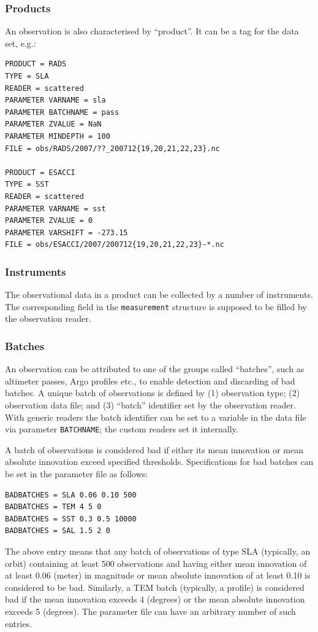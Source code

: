 \documentclass[11pt]{report}
\begin{document}
\subsubsection{Products}

An observation is also characterised by ``product''.
It can be a tag for the data set, e.g.:
\begin{Verbatim}[frame=single,fontsize=\footnotesize]
PRODUCT = RADS
TYPE = SLA
READER = scattered
PARAMETER VARNAME = sla
PARAMETER BATCHNAME = pass
PARAMETER ZVALUE = NaN
PARAMETER MINDEPTH = 100
FILE = obs/RADS/2007/??_200712{19,20,21,22,23}.nc

PRODUCT = ESACCI
TYPE = SST
READER = scattered
PARAMETER VARNAME = sst
PARAMETER ZVALUE = 0
PARAMETER VARSHIFT = -273.15
FILE = obs/ESACCI/2007/200712{19,20,21,22,23}-*.nc
\end{Verbatim}

\subsubsection{Instruments}

The observational data in a product can be collected by a number of instruments.
The corresponding field in the \verb|measurement| structure is supposed to be filled by the observation reader.

\subsubsection{Batches}
\label{sec:batches}

An observation can be attributed to one of the groups called ``batches'', such as altimeter passes, Argo profiles etc., to enable detection and discarding of bad batches.
A unique batch of observations is defined by (1) observation type; (2) observation data file; and (3) ``batch'' identifier set by the observation reader.
With generic readers the batch identifier can be set to a variable in the data file via parameter \verb|BATCHNAME|; the custom readers set it internally.

A batch of observations is considered bad if either its mean innovation or mean absolute innovation exceed specified thresholds.
Specifications for bad batches can be set in the parameter file as follows:
\begin{Verbatim}[frame=single,fontsize=\footnotesize]
BADBATCHES = SLA 0.06 0.10 500
BADBATCHES = TEM 4 5 0
BADBATCHES = SST 0.3 0.5 10000
BADBATCHES = SAL 1.5 2 0
\end{Verbatim}
The above entry means that any batch of observations of type SLA (typically, an orbit) containing at least 500 observations and having either mean innovation of at least 0.06 (meter) in magnitude or mean absolute innovation of at least 0.10 is considered to be bad.
Similarly, a TEM batch (typically, a profile) is considered bad if the mean innovation exceeds 4 (degrees) or the mean absolute innovation exceeds 5 (degrees).
The parameter file can have an arbitrary number of such entries.
\end{document}
